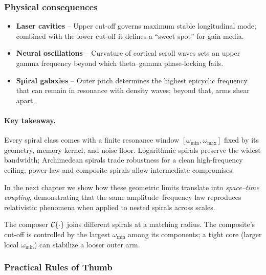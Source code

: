 \subsubsection*{Physical consequences}

\begin{itemize}[leftmargin=1.5em]
  \item \textbf{Laser cavities} – Upper cut-off governs maximum stable longitudinal mode; combined with the lower cut-off it defines a “sweet spot” for gain media.
  \item \textbf{Neural oscillations} – Curvature of cortical scroll waves sets an upper gamma frequency beyond which theta–gamma phase-locking fails.
  \item \textbf{Spiral galaxies} – Outer pitch determines the highest epicyclic frequency that can remain in resonance with density waves; beyond that, arms shear apart.
\end{itemize}

\paragraph{Key takeaway.}
Every spiral class comes with a finite resonance window \([\omega_{\min},\omega_{\max}]\) fixed by its geometry, memory kernel, and noise floor. Logarithmic spirals preserve the widest bandwidth; Archimedean spirals trade robustness for a clean high-frequency ceiling; power-law and composite spirals allow intermediate compromises.

\bigskip

In the next chapter we show how these geometric limits translate into \emph{space–time coupling}, demonstrating that the same amplitude–frequency law reproduces relativistic phenomena when applied to nested spirals across scales.

The composer \(\mathcal{C}\{\cdot\}\) joins different spirals at a matching radius. The composite’s cut-off
is controlled by the largest \(\omega_{\min}\) among its components; a tight core (larger local \(\omega_{\min}\))
can stabilize a looser outer arm.


\subsubsection{Practical Rules of Thumb}

